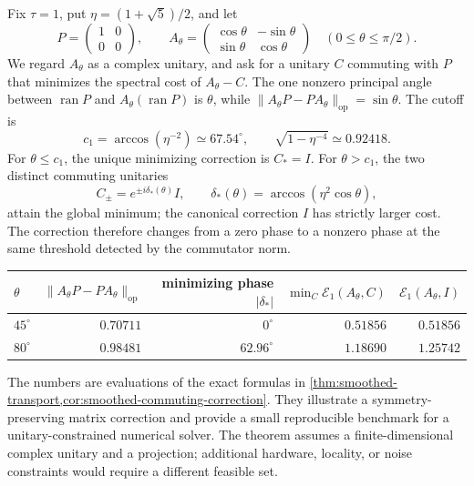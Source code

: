 Fix $\tau=1$, put $\eta=(1+\sqrt5)/2$, and let
\[
 P=\begin{pmatrix}1&0\\0&0\end{pmatrix},\qquad
 A_\theta=\begin{pmatrix}\cos\theta&-\sin\theta\\
                              \sin\theta&\cos\theta\end{pmatrix}
 \quad (0\leq\theta\leq\pi/2).
\]
We regard $A_\theta$ as a complex unitary, and ask for a unitary $C$
commuting with $P$ that minimizes the spectral cost of $A_\theta-C$.
The one nonzero principal angle between $\operatorname{ran}P$ and
$A_\theta(\operatorname{ran}P)$ is $\theta$, while
$\|A_\theta P-PA_\theta\|_{\mathrm{op}}=\sin\theta$.
The cutoff is
\[
 c_1=\arccos(\eta^{-2})\simeq67.54^\circ,
 \qquad \sqrt{1-\eta^{-4}}\simeq0.92418.
\]
For $\theta\leq c_1$, the unique minimizing correction is $C_*=I$.
For $\theta>c_1$, the two distinct commuting unitaries
\[
 C_\pm=e^{\pm i\delta_*(\theta)}I,
 \qquad\delta_*(\theta)=\arccos(\eta^2\cos\theta),
\]
attain the global minimum; the canonical correction $I$ has strictly
larger cost. The correction therefore changes from a zero phase to a
nonzero phase at the same threshold detected by the commutator norm.

\begin{center}
\small
\begin{tabular}{@{}lrrrr@{}}
\toprule
$\theta$ & $\|A_\theta P-PA_\theta\|_{\mathrm{op}}$
 & minimizing phase $|\delta_*|$
 & $\min_C\mathcal E_1(A_\theta,C)$ & $\mathcal E_1(A_\theta,I)$ \\
\midrule
$45^\circ$ & $0.70711$ & $0^\circ$ & $0.51856$ & $0.51856$ \\
$80^\circ$ & $0.98481$ & $62.96^\circ$ & $1.18690$ & $1.25742$ \\
\bottomrule
\end{tabular}
\end{center}

The numbers are evaluations of the exact formulas in
\cref{thm:smoothed-transport,cor:smoothed-commuting-correction}.
They illustrate a symmetry-preserving matrix correction and provide a
small reproducible benchmark for a unitary-constrained numerical solver.
The theorem assumes a finite-dimensional complex unitary and a projection;
additional hardware, locality, or noise constraints would require a
different feasible set.
